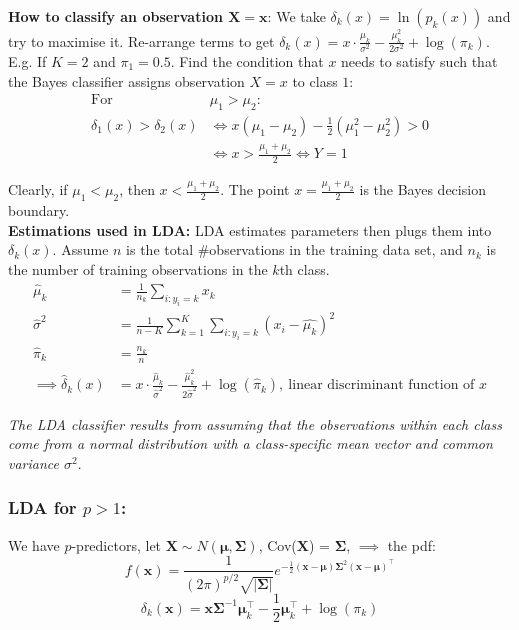 \documentclass[11pt]{article}
\begin{document}
\noindent \textbf{How to classify an observation $\boldsymbol{X = x}$}: We take $\delta_k(x) = \ln(p_k(x))$ and try to maximise it. Re-arrange terms to get $\delta_k(x) = x \cdot \frac{\mu_k}{\sigma^2} - \frac{\mu_k^2}{2\sigma^2} + \log(\pi_k)$. \\

\noindent E.g. If $K=2$ and $\pi_1 = 0.5$. Find the condition that $x$ needs to satisfy such that the Bayes classifier assigns observation $X=x$ to class $1$: \\

\begin{align*}
    \text{For } & \mu_1 > \mu_2: \\
    \delta_1(x) > \delta_{2}(x) &\Leftrightarrow x(\mu_1 - \mu_2) - \frac{1}{2}(\mu_1^2 - \mu_2^2) > 0 \\
    &\Leftrightarrow x > \frac{\mu_1 + \mu_2}{2} \Leftrightarrow Y = 1
\end{align*}

\noindent Clearly, if $\mu_1 < \mu_2$, then $x < \frac{\mu_1 + \mu_2}{2}$. The point $x = \frac{\mu_1 + \mu_2}{2}$ is the Bayes decision boundary. \\

\noindent \textbf{Estimations used in LDA:} LDA estimates parameters then plugs them into $\delta_k(x)$. Assume $n$ is the total \#observations in the training data set, and $n_k$ is the number of training observations in the $k$th class. \\

\begin{align*}
    \hat{\mu}_k &= \frac{1}{n_k} \sum_{i: y_i = k}{x_k} \\
    \hat{\sigma}^2 &= \frac{1}{n-K}\sum_{k=1}^{K}\sum_{i: y_i = k}(x_i - \hat{\mu_k})^2 \\
    \hat{\pi}_k &= \frac{n_k}{n} \\
    \implies \hat{\delta}_k(x) &= x \cdot \frac{\hat{\mu}_k}{\hat{\sigma}^2} - \frac{\hat{\mu}_k^2}{2\hat{\sigma}^2} + \log(\hat{\pi}_k), \ \text{linear discriminant function of $x$}
\end{align*}

\noindent \textit{The LDA classifier results from assuming that the observations within each class come from a normal distribution with a class-specific mean vector and common variance $\sigma^2$}.

\subsubsection{LDA for $p > 1$:}
\noindent We have $p$-predictors, let $\boldsymbol{X} \sim N(\boldsymbol{\mu}, \boldsymbol{\Sigma})$, Cov($\boldsymbol{X}$) = $\boldsymbol{\Sigma}$, $\implies$ the pdf:
$$f(\boldsymbol{x}) = \frac{1}{(2\pi)^{p/2}\sqrt{|\boldsymbol{\Sigma}|}}e^{-\frac{1}{2}(\boldsymbol{x} - \boldsymbol{\mu})\boldsymbol{\Sigma}^2(\boldsymbol{x} - \boldsymbol{\mu})^\top}$$
$$\delta_k(\boldsymbol{x}) = \boldsymbol{x}\boldsymbol{\Sigma}^{-1}\boldsymbol{\mu}_k^\top - \frac{1}{2}\boldsymbol{\mu}_k^{\top} + \log(\pi_k)$$
\end{document}
